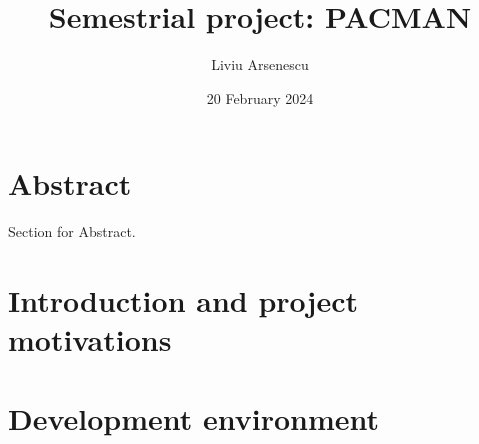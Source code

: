 \documentclass{article}
\title{Semestrial project: PACMAN}
\date{20 February 2024}
\author{Liviu Arsenescu}
\begin{document}
    \maketitle
    \newpage

    \section*{Abstract}
    Section for Abstract.
    \newpage

    \tableofcontents
    \newpage

    \section{Introduction and project motivations}
    \newpage
    
    \section{Development environment}
    \newpage
\end{document}
